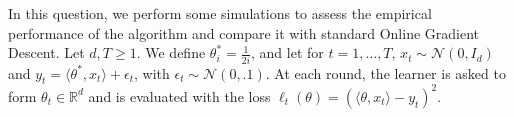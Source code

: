 \documentclass[11pt]{exam}
\newcommand{\R}{\mathbb{R}}
\newcommand{\cN}{\mathcal{N}}
\begin{document}
\begin{questions}
	\question In this question, we perform some simulations to assess the empirical performance of the algorithm and compare it with standard Online Gradient Descent. Let $d,T \geq 1$. We define $\theta^*_i = \frac{1}{2i}$, and  let for $t=1,\dots, T$, $x_t \sim \cN(0,I_d)$ and $y_t = \langle \theta^*, x_t \rangle + \epsilon_t$, with $\epsilon_t \sim \cN(0,.1)$. At each round, the learner is asked to form $\theta_t \in \R^d$ and is evaluated with the loss $\ell_t(\theta) = (\langle\theta,x_t\rangle - y_t)^2$. 


\end{questions}



\end{document}
